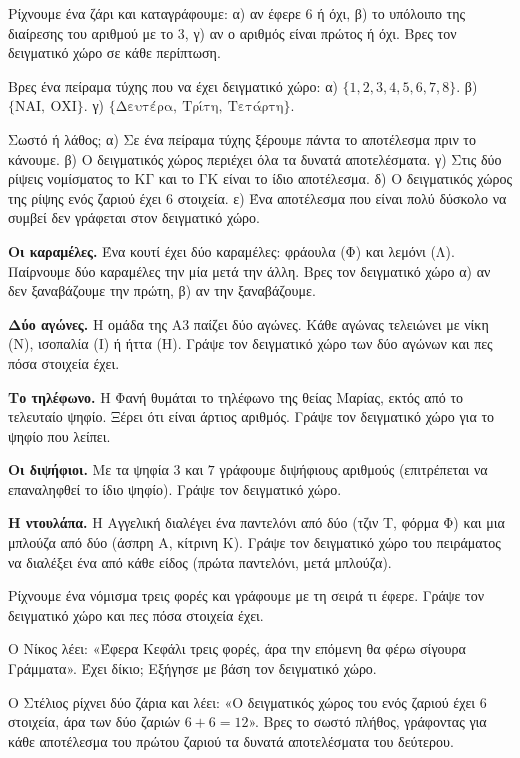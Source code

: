 \ex Ρίχνουμε ένα ζάρι και καταγράφουμε: α) αν έφερε $6$ ή όχι, β) το υπόλοιπο της διαίρεσης του αριθμού με το $3$, γ) αν ο αριθμός είναι πρώτος ή όχι. Βρες τον δειγματικό χώρο σε κάθε περίπτωση.

\ex Βρες ένα πείραμα τύχης που να έχει δειγματικό χώρο: α) $\{1,2,3,4,5,6,7,8\}$. β) $\{\text{ΝΑΙ},\ \text{ΟΧΙ}\}$. γ) $\{\text{Δευτέρα},\ \text{Τρίτη},\ \text{Τετάρτη}\}$.

\ex Σωστό ή λάθος; α) Σε ένα πείραμα τύχης ξέρουμε πάντα το αποτέλεσμα πριν το κάνουμε. β) Ο δειγματικός χώρος περιέχει όλα τα δυνατά αποτελέσματα. γ) Στις δύο ρίψεις νομίσματος το $\mathrm{ΚΓ}$ και το $\mathrm{ΓΚ}$ είναι το ίδιο αποτέλεσμα. δ) Ο δειγματικός χώρος της ρίψης ενός ζαριού έχει $6$ στοιχεία. ε) Ένα αποτέλεσμα που είναι πολύ δύσκολο να συμβεί δεν γράφεται στον δειγματικό χώρο.


\ex \textbf{Οι καραμέλες.} Ένα κουτί έχει δύο καραμέλες: φράουλα (Φ) και λεμόνι (Λ). Παίρνουμε δύο καραμέλες την μία μετά την άλλη. Βρες τον δειγματικό χώρο α) αν δεν ξαναβάζουμε την πρώτη, β) αν την ξαναβάζουμε.

\ex \textbf{Δύο αγώνες.} Η ομάδα της Α3 παίζει δύο αγώνες. Κάθε αγώνας τελειώνει με νίκη (Ν), ισοπαλία (Ι) ή ήττα (Η). Γράψε τον δειγματικό χώρο των δύο αγώνων και πες πόσα στοιχεία έχει.

\ex \textbf{Το τηλέφωνο.} Η Φανή θυμάται το τηλέφωνο της θείας Μαρίας, εκτός από το τελευταίο ψηφίο. Ξέρει ότι είναι άρτιος αριθμός. Γράψε τον δειγματικό χώρο για το ψηφίο που λείπει.

\ex \textbf{Οι διψήφιοι.} Με τα ψηφία $3$ και $7$ γράφουμε διψήφιους αριθμούς (επιτρέπεται να επαναληφθεί το ίδιο ψηφίο). Γράψε τον δειγματικό χώρο.

\ex \textbf{Η ντουλάπα.} Η Αγγελική διαλέγει ένα παντελόνι από δύο (τζιν Τ, φόρμα Φ) και μια μπλούζα από δύο (άσπρη Α, κίτρινη Κ). Γράψε τον δειγματικό χώρο του πειράματος να διαλέξει ένα από κάθε είδος (πρώτα παντελόνι, μετά μπλούζα).


\ex Ρίχνουμε ένα νόμισμα τρεις φορές και γράφουμε με τη σειρά τι έφερε. Γράψε τον δειγματικό χώρο και πες πόσα στοιχεία έχει.

\ex Ο Νίκος λέει: «Έφερα Κεφάλι τρεις φορές, άρα την επόμενη θα φέρω σίγουρα Γράμματα». Έχει δίκιο; Εξήγησε με βάση τον δειγματικό χώρο.

\ex Ο Στέλιος ρίχνει δύο ζάρια και λέει: «Ο δειγματικός χώρος του ενός ζαριού έχει $6$ στοιχεία, άρα των δύο ζαριών $6+6=12$». Βρες το σωστό πλήθος, γράφοντας για κάθε αποτέλεσμα του πρώτου ζαριού τα δυνατά αποτελέσματα του δεύτερου.

